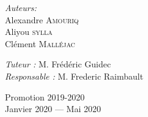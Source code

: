 \documentclass[a4paper,10pt]{article}
\begin{document}
\begin{titlepage}
\begin{sffamily}
\begin{center}
    \noindent
    \begin{minipage}{.39\textwidth}
        \begin{flushleft} \large
            \emph{Auteurs:} \\
            Alexandre \textsc{Amouriq} \\
    		Aliyou \textsc{sylla} \\
    		Clément \textsc{Malléjac} \\ 
        \end{flushleft}
    \end{minipage}
    \hfill
    \begin{minipage}{.59\textwidth}
        \begin{flushright} \large
            \emph{Tuteur :} M. Frédéric Guidec \\
            \emph{Responsable :} M. Frederic Raimbault \\
        \end{flushright}
    \end{minipage}
    
    \vfill %
    
     
    {\large } Promotion 2019-2020\\{Janvier 2020 — Mai 2020}
 \end{center}
  \end{sffamily}
\end{titlepage}

\newpage
\end{document}
